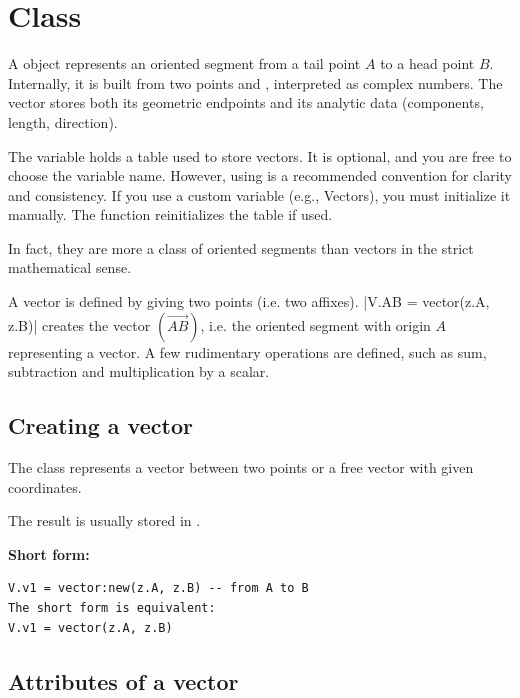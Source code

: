 \newpage

\section{Class }
\label{sec:class_vector}

A  object represents an oriented segment from a tail point $A$ to a head point $B$.
Internally, it is built from two points  and , interpreted as complex numbers.
The vector stores both its geometric endpoints and its analytic data (components, length, direction).



The variable  holds a table used to store vectors. It is optional, and you are free to choose the variable name. However, using  is a recommended convention for clarity and consistency. If you use a custom variable (e.g., Vectors), you must initialize it manually. The  function reinitializes the  table if used.

\vspace{1em}
In fact, they are more a class of oriented segments than vectors in the strict mathematical sense.

A vector is defined by giving two points (i.e. two affixes).
|V.AB = vector(z.A, z.B)| creates the vector $(\overrightarrow{AB})$, i.e. the oriented segment with origin $A$ representing a vector. A few rudimentary operations are defined, such as sum, subtraction and multiplication by a scalar.


\subsection{Creating a vector}
\label{sub:creating_a_vector}

The  class represents a vector between two points or a free vector with given coordinates.

\medskip
The result is usually stored in .

\medskip
\textbf{Short form: }
\begin{mybox}
\begin{verbatim}
V.v1 = vector:new(z.A, z.B) -- from A to B
The short form is equivalent:
V.v1 = vector(z.A, z.B)
\end{verbatim}
\end{mybox}



\subsection{Attributes of a vector}

